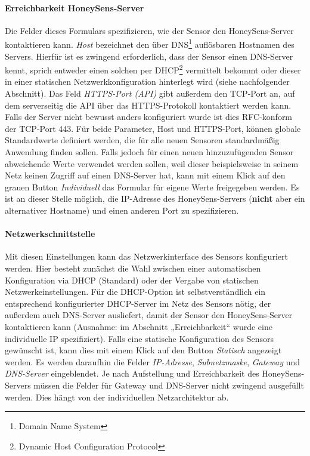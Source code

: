 \documentclass[12pt]{article}
\begin{document}
\paragraph{Erreichbarkeit HoneySens-Server}
Die Felder dieses Formulars spezifizieren, wie der Sensor den HoneySens-Server kontaktieren kann. \textit{Host} bezeichnet den über DNS\footnote{Domain Name System} auflösbaren Hostnamen des Servers. Hierfür ist es zwingend erforderlich, dass der Sensor einen DNS-Server kennt, sprich entweder einen solchen per DHCP\footnote{Dynamic Host Configuration Protocol} vermittelt bekommt oder dieser in einer statischen Netzwerkkonfiguration hinterlegt wird (siehe nachfolgender Abschnitt). Das Feld \textit{HTTPS-Port (API)} gibt außerdem den TCP-Port an, auf dem serverseitig die API über das HTTPS-Protokoll kontaktiert werden kann. Falls der Server nicht bewusst anders konfiguriert wurde ist dies RFC-konform der TCP-Port 443. Für beide Parameter, Host und HTTPS-Port, können globale Standardwerte definiert werden, die für alle neuen Sensoren standardmäßig Anwendung finden sollen. Falls jedoch für einen neuen hinzuzufügenden Sensor abweichende Werte verwendet werden sollen, weil dieser beispielsweise in seinem Netz keinen Zugriff auf einen DNS-Server hat, kann mit einem Klick auf den grauen Button \textit{Individuell} das Formular für eigene Werte freigegeben werden. Es ist an dieser Stelle möglich, die IP-Adresse des HoneySens-Servers (\textbf{nicht} aber ein alternativer Hostname) und einen anderen Port zu spezifizieren.

\paragraph{Netzwerkschnittstelle}
Mit diesen Einstellungen kann das Netzwerkinterface des Sensors konfiguriert werden. Hier besteht zunächst die Wahl zwischen einer automatischen Konfiguration via DHCP (Standard) oder der Vergabe von statischen Netzwerkeinstellungen. Für die DHCP-Option ist selbstverständlich ein entsprechend konfigurierter DHCP-Server im Netz des Sensors nötig, der außerdem auch DNS-Server ausliefert, damit der Sensor den HoneySens-Server kontaktieren kann (Ausnahme: im Abschnitt „Erreichbarkeit“ wurde eine individuelle IP spezifiziert). Falls eine statische Konfiguration des Sensors gewünscht ist, kann dies mit einem Klick auf den Button \textit{Statisch} angezeigt werden. Es werden daraufhin die Felder \textit{IP-Adresse}, \textit{Subnetzmaske}, \textit{Gateway} und \textit{DNS-Server} eingeblendet. Je nach Aufstellung und Erreichbarkeit des HoneySens-Servers müssen die Felder für Gateway und DNS-Server nicht zwingend ausgefüllt werden. Dies hängt von der individuellen Netzarchitektur ab.
\end{document}

